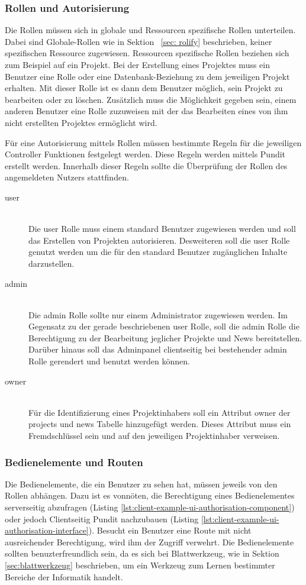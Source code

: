\subsubsection{Rollen und Autorisierung}
Die Rollen müssen sich in globale und Ressourcen spezifische Rollen unterteilen. Dabei sind Globale-Rollen wie in Sektion ~\ref{sec: rolify} beschrieben, keiner spezifischen Ressource zugewiesen. Ressourcen spezifische Rollen beziehen sich zum Beispiel auf ein Projekt. Bei der Erstellung eines Projektes muss ein Benutzer eine Rolle oder eine Datenbank-Beziehung zu dem jeweiligen Projekt erhalten. Mit dieser Rolle ist es dann dem Benutzer möglich, sein Projekt zu bearbeiten oder zu löschen. Zusätzlich muss die Möglichkeit gegeben sein, einem anderen Benutzer eine Rolle zuzuweisen mit der das Bearbeiten eines von ihm nicht erstellten Projektes ermöglicht wird.

Für eine Autorisierung mittels Rollen müssen bestimmte Regeln für die jeweiligen Controller Funktionen festgelegt werden. Diese Regeln werden mittels Pundit erstellt werden. Innerhalb dieser Regeln sollte die Überprüfung der Rollen des angemeldeten Nutzers stattfinden.


\begin{description}
	\item[user]\hfill\\
	Die user Rolle muss einem standard Benutzer zugewiesen werden und soll das Erstellen von Projekten autorisieren. Desweiteren soll die user Rolle genutzt werden um die für den standard Benutzer zugänglichen Inhalte darzustellen.
	\item[admin]\hfill\\
	Die admin Rolle sollte nur einem Administrator zugewiesen werden. Im Gegensatz zu der gerade beschriebenen user Rolle, soll die admin Rolle die Berechtigung zu der Bearbeitung jeglicher Projekte und News bereitstellen. Darüber hinaus soll das Adminpanel clientseitig bei bestehender admin Rolle gerendert und benutzt werden können.
	\item[owner]\hfill\\
	Für die Identifizierung eines Projektinhabers soll ein Attribut owner der projects und news Tabelle hinzugefügt werden. Dieses Attribut muss ein Fremdschlüssel sein und auf den jeweiligen Projektinhaber verweisen.
\end{description}

\subsubsection{Bedienelemente und Routen}
Die Bedienelemente, die ein Benutzer zu sehen hat, müssen jeweils von den Rollen abhängen. Dazu ist es vonnöten, die Berechtigung eines Bedienelementes serverseitig abzufragen (Listing \ref{lst:client-example-ui-authorisation-component}) oder jedoch Clientseitig Pundit nachzubauen (Listing \ref{lst:client-example-ui-authorisation-interface}). Besucht ein Benutzer eine Route mit nicht ausreichender Berechtigung, wird ihm der Zugriff verwehrt. Die Bedienelemente sollten benuzterfreundlich sein, da es sich bei Blattwerkzeug, wie in Sektion \ref{sec:blattwerkzeug} beschrieben, um ein Werkzeug zum Lernen bestimmter Bereiche der Informatik handelt.

